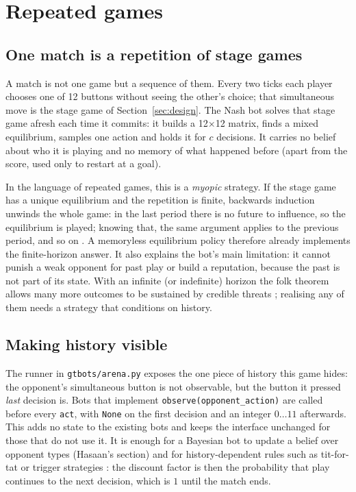 \section{Repeated games}
\label{sec:repeated}

\subsection{One match is a repetition of stage games}

A match is not one game but a sequence of them. Every two ticks each player
chooses one of 12 buttons without seeing the other's choice; that simultaneous
move is the stage game of Section~\ref{sec:design}. The Nash bot solves that
stage game afresh each time it commits: it builds a 12$\times$12 matrix,
finds a mixed equilibrium, samples one action and holds it for $c$ decisions.
It carries no belief about who it is playing and no memory of what happened
before (apart from the score, used only to restart at a goal).

In the language of repeated games, this is a \emph{myopic} strategy. If the
stage game has a unique equilibrium and the repetition is finite, backwards
induction unwinds the whole game: in the last period there is no future to
influence, so the equilibrium is played; knowing that, the same argument
applies to the previous period, and so on \cite{fudenberg1991game}.
A memoryless equilibrium policy therefore already implements the finite-horizon
answer. It also explains the bot's main limitation: it cannot punish a
weak opponent for past play or build a reputation, because the past is not
part of its state. With an infinite (or indefinite) horizon the folk theorem
allows many more outcomes to be sustained by credible threats \cite{aumann1981repeated};
realising any of them needs a strategy that conditions on history.

\subsection{Making history visible}

The runner in \texttt{gtbots/arena.py} exposes the one piece of history this
game hides: the opponent's simultaneous button is not observable, but the
button it pressed \emph{last} decision is. Bots that implement
\texttt{observe(opponent\_action)} are called before every \texttt{act}, with
\texttt{None} on the first decision and an integer $0\ldots11$ afterwards.
This adds no state to the existing bots and keeps the interface unchanged for
those that do not use it. It is enough for a Bayesian bot to update a belief
over opponent types (Hasaan's section) and for history-dependent rules such as
tit-for-tat or trigger strategies \cite{axelrod1984cooperation}: the discount factor is then the probability
that play continues to the next decision, which is $1$ until the match ends.

